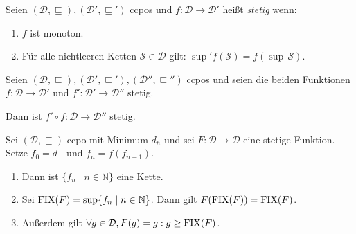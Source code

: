 \par\bigskip
\begin{definition}[Stetigkeit]
    Seien $(\mathcal{D}, \sqsubseteq), (\mathcal{D}',\sqsubseteq')$ ccpos und $f: \mathcal{D} \to \mathcal{D}'$ heißt \emph{stetig} wenn:
    \begin{enumerate}
        \item $f$ ist monoton.
        \item Für alle nichtleeren Ketten $\mathcal{S} \in \mathcal{D}$ gilt: $\sup' f(\mathcal{S}) = f(\sup\, \mathcal{S})$.
    \end{enumerate}
\end{definition}

\par\medskip
\begin{observation}
    Seien $(\mathcal{D}, \sqsubseteq), (\mathcal{D}',\sqsubseteq'), (\mathcal{D}'',\sqsubseteq'')$ ccpos und seien die beiden Funktionen $f: \mathcal{D} \to \mathcal{D}'$ und $f': \mathcal{D}' \to \mathcal{D}''$ stetig.

    Dann ist $f' \circ f: \mathcal{D} \to \mathcal{D}''$ stetig.
\end{observation}


\par\bigskip
\begin{theorem}
    Sei $(\mathcal{D}, \sqsubseteq)$ ccpo mit Minimum $d_h$ und sei $F : \mathcal{D} \to \mathcal{D}$ eine stetige Funktion. Setze $f_0 = d_{\bot}$ und $f_n = f(f_{n-1})$.

    \begin{enumerate}
        \item Dann ist $\{ f_n \mid n \in \mathbb{N} \}$ eine Kette.
        \item Sei $\operatorname{FIX}(F) = \sup \{ f_n \mid n \in \mathbb{N} \}$. Dann gilt $F(\operatorname{FIX}(F)) = \operatorname{FIX}(F)$.
        \item Außerdem gilt $\forall g \in \mathcal{D}, F(g) = g: g \geq \operatorname{FIX}(F)$.
    \end{enumerate}
\end{theorem}

